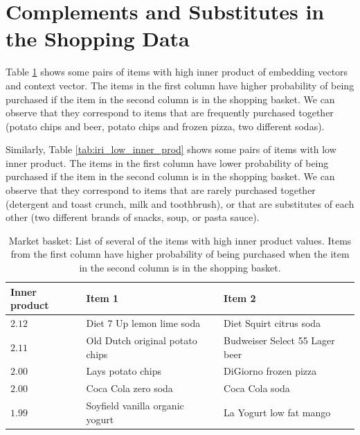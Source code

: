\documentclass[12pt]{article}
\begin{document}
\section{Complements and Substitutes in the Shopping Data}
\label{sec:complements_substitutes}
Table \ref{tab:iri_high_inner_prod} shows some pairs of items with high inner product of embedding vectors and context vector. The items in the first column have higher probability of being purchased if the item in the second column is in the shopping basket. We can observe that they correspond to items that are frequently purchased together (potato chips and beer, potato chips and frozen pizza, two different sodas).

Similarly, Table \ref{tab:iri_low_inner_prod} shows some pairs of items with low inner product. The items in the first column have lower probability of being purchased if the item in the second column is in the shopping basket. We can observe that they correspond to items that are rarely purchased together (detergent and toast crunch, milk and toothbrush), or that are substitutes of each other (two different brands of snacks, soup, or pasta sauce).
\vspace{-5pt}
\begin{table}[h]
	\centering
  \scriptsize
	\begin{tabular}{lll}\toprule
		Inner product & Item 1 & Item 2 \\ \hline
    $2.12$ & Diet 7 Up lemon lime soda & Diet Squirt citrus soda \\
    $2.11$ & Old Dutch original potato chips & Budweiser Select 55 Lager beer \\
    $2.00$ & Lays potato chips & DiGiorno frozen pizza \\
    $2.00$ & Coca Cola zero soda & Coca Cola soda \\
    $1.99$ & Soyfield vanilla organic yogurt & La Yogurt low fat mango \\
		\bottomrule
	\end{tabular}
	\caption{Market basket: List of several of the items with high inner product values. Items from the first column have higher probability of being purchased when the item in the second column is in the shopping basket.\label{tab:iri_high_inner_prod}}
\end{table}
\vspace{-25pt}
\end{document}
